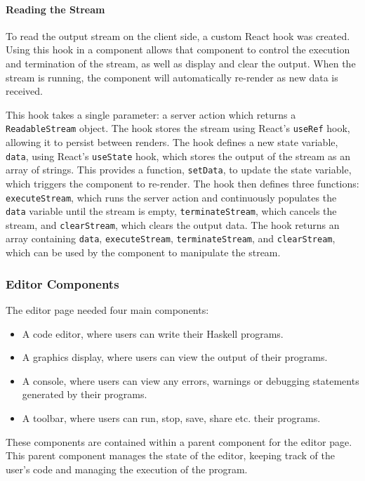 \documentclass[../main.tex]{subfiles}
\begin{document}
                \paragraph{Reading the Stream}
                    To read the output stream on the client side, a custom React hook was created.
                    Using this hook in a component allows that component to control the execution
                        and termination of the stream, as well as display and clear the output.
                    When the stream is running, the component will automatically re-render as new
                        data is received.

                    This hook takes a single parameter: a server action which returns a
                        \texttt{ReadableStream} object.
                    The hook stores the stream using React's \texttt{useRef} hook, allowing it to
                        persist between renders.
                    The hook defines a new state variable, \texttt{data}, using React's
                        \texttt{useState} hook, which stores the output of the stream as an array of
                        strings.
                    This provides a function, \texttt{setData}, to update the state variable, which
                        triggers the component to re-render.
                    The hook then defines three functions: \texttt{executeStream}, which runs the
                        server action and continuously populates the \texttt{data} variable until the
                        stream is empty, \texttt{terminateStream}, which cancels the stream, and
                        \texttt{clearStream}, which clears the output data.
                    The hook returns an array containing \texttt{data}, \texttt{executeStream},
                        \texttt{terminateStream}, and \texttt{clearStream}, which can be used by the
                        component to manipulate the stream.

            \subsubsection{Editor Components}
                The editor page needed four main components:
                \begin{itemize}
                    \item A code editor, where users can write their Haskell programs.
                    \item A graphics display, where users can view the output of their programs.
                    \item A console, where users can view any errors, warnings or debugging statements
                          generated by their programs.
                    \item A toolbar, where users can run, stop, save, share etc. their programs.
                \end{itemize}
                These components are contained within a parent component for the editor page.
                This parent component manages the state of the editor, keeping track of the
                    user's code and managing the execution of the program.
\end{document}

